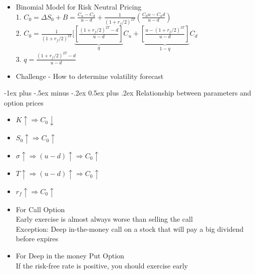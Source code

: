 \documentclass[10pt,landscape]{article}
\makeatletter
\renewcommand{\section}{\@startsection{section}{1}{0mm}%
                                {-1ex plus -.5ex minus -.2ex}%
                                {0.5ex plus .2ex}%
                                {\normalfont\large\bfseries}}
\makeatother
\begin{document}
\begin{multicols}{2}
\begin{itemize}
        \item {\color{red}Binomial Model for Risk Neutral Pricing}\\
            1. $C_{0}=\Delta S_{0}+B=\frac{C_{u}-C_{d}}{u-d}+\frac{1}{\left(1+r_{f} / 2\right)^{2 T}}\left(\frac{C_{d} u-C_{u} d}{u-d}\right)$\\
            2. $C_{0}=\frac{1}{\left(1+r_{f} / 2\right)^{2 T}}[\underbrace{\left[\frac{\left(1+r_{f} / 2\right)^{2 T}-d}{u-d}\right]}_{q} C_{u}+\underbrace{\left[\frac{u-\left(1+r_{f} / 2\right)^{2 T}}{u-d}\right]}_{1-q} C_{d}$\\
            3. $q=\frac{\left(1+r_{f} / 2\right)^{2 T}-d}{u-d}$\\
        \item Challenge - How to determine volatility forecast
    \end{itemize}

    \section{Relationship between parameters and option prices}
    \begin{itemize}
        \item $K \uparrow \Rightarrow C_{0} \downarrow$
        \item $S_{0} \uparrow \Rightarrow C_{0} \uparrow$
        \item $\sigma \uparrow \Rightarrow(u-d) \uparrow \Rightarrow C_{0} \uparrow$
        \item $T \uparrow \Rightarrow(u-d) \uparrow \Rightarrow C_{0} \uparrow$
        \item $r_{f} \uparrow \Rightarrow C_{0} \uparrow$
        \item For Call Option\\Early exercise is almost always worse than selling the call\\Exception: Deep in-the-money call on a stock that will pay a big dividend before expires
        \item For Deep in the money Put Option\\
        If the risk-free rate is positive, you should exercise early
    \end{itemize}


\end{multicols}
\end{document}
